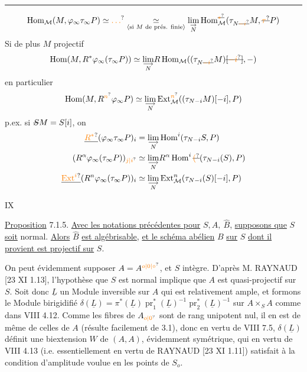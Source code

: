 \noindent\rule{.98\linewidth}{.3pt}\par
\[
\operatorname{Hom}_{\mathcal M}(M,\varphi_\infty\tau_\infty P)\simeq\unsure{\ldots}\underset{\inserted{\text{si }M\text{ de prés. finie}}}{\simeq}
\underset{\substack{\rightarrow\\N}}{\lim}\operatorname{Hom}_{\mathcal M}^{\deleted{\unsure{*}}}(\tau_{N\deleted{\unsure{-i}}}M,\deleted{\unsure{\tau}}P)
\]
Si de plus $M$ projectif
\[
\operatorname{Hom}(M,R^*\varphi_\infty(\tau_\infty P))\simeq
\underset{\substack{\longrightarrow\\N}}{\lim}R\operatorname{Hom}_{\mathcal M}((\tau_{N\deleted{\unsure{-i}}}M)\deleted{[\unsure{-i}]},-)
\]
en particulier
\[
\operatorname{Hom}(M,R^{\unsure{n}}\varphi_\infty P)\simeq
\underset{\substack{\longrightarrow\\N}}{\lim}\operatorname{Ext}^{\unsure{n}}_{\mathcal M}((\tau_{N-i}M)[-i],P)
\]
p.ex. si $\deleted{S}M=S[i]$, on 
\[
\begin{aligned}
\deleted{\unsure{R^*}}(\varphi_\infty\tau_\infty P)_i
 &=\underset{\substack{\longrightarrow\\N}}{\lim}\operatorname{Hom}^i(\tau_{N-i}S,P)\\
(R^\alpha\varphi_\infty(\tau_\infty P))_{\unsure{j|i}}
 &\simeq\underset{\substack{\longrightarrow\\N}}{\lim}R^\alpha\operatorname{Hom}^i\deleted{\unsure{(}}(\tau_{N-i}(S),P)\\
\deleted{\unsure{\operatorname{Ext}^i}}(R^n\varphi_\infty(\tau_\infty P))_i
 &\simeq\underset{\substack{\longrightarrow\\N}}{\lim}\operatorname{Ext}_{\mathcal M}^n(\tau_{N-i}(S)[-i],P)
\end{aligned}
\]

\hfill IX

\uline{Proposition} 7.1.5. \uline{Avec les notations précédentes pour} $S,A,\ \hat B$, \uline{supposons que} $S$ \uline{soit} normal. \uline{Alors} $\hat B$ \uline{est algébrisable}, \uline{et le schéma abélien} $B$ \uline{sur} $S$ \uline{dont il provient est projectif sur} $S$.

On peut évidemment supposer $A=A^{\unsure{o|0|\circ}}$, et $S$ intègre. D'après M. RAYNAUD [23 XI 1.13], l'hypothèse que $S$ est normal implique que $A$ est quasi-projectif sur $S$. Soit donc $\underline L$ un Module inversible sur $A$ qui est relativement ample, et formons le Module birigidifié $\delta(\underline L)=\pi^*(\underline L)\operatorname{pr}_1^*(\underline L)^{-1}\operatorname{pr}_2^*(\underline L)^{-1}$ sur $A\times_S A$ comme dans VIII 4.12. Comme les fibres de $A_{\unsure{o|0}}$ sont de rang unipotent nul, il en est de même de celles de $A$ (résulte facilement de 3.1), donc en vertu de VIII 7.5, $\delta(\underline L)$ définit une biextension $W$ de $(A,A)$, évidemment symétrique, qui en vertu de VIII 4.13 (i.e. essentiellement en vertu de RAYNAUD [23 XI 1.11]) satisfait à la condition d'amplitude voulue en les points de $S_o$.

